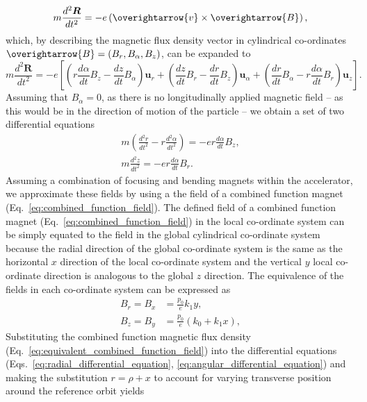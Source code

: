 \documentclass[../main.tex]{subfiles}
\begin{document}
\begin{equation}
m\frac{d^{2}\boldsymbol{R}}{dt^{2}}=-e\left(\overightarrow{v}\times\overightarrow{B}\right),
\label{eq:Lorentz_particle_equating_forces}
\end{equation}
which, by describing the magnetic flux density vector in cylindrical co-ordinates $\overightarrow{B} = \left(B_{r},B_{\alpha},B_{z}\right)$, can be expanded to
\begin{equation}
m\frac{d^{2}\boldsymbol{R}}{dt^{2}} = -e\left[\left(r\frac{d\alpha}{dt}B_{z}-\frac{dz}{dt}B_{\alpha}\right)\boldsymbol{u}_{r}+\left(\frac{dz}{dt}B_{r}-\frac{dr}{dt}B_{z}\right)\boldsymbol{u}_{\alpha}+\left(\frac{dr}{dt}B_{\alpha}-r\frac{d\alpha}{dt}B_{r}\right)\boldsymbol{u}_{z}\right].
\label{eq:Lorentz_particle_equating_forces_expanded}    
\end{equation}
Assuming that $B_{\alpha}=0$, as there is no longitudinally applied magnetic field -- as this would be in the direction of motion of the particle -- we obtain a set of two differential equations
\begin{align}
m\left(\frac{d^{2}r}{dt^{2}}-r\frac{d^{2}\alpha}{dt^{2}}\right)=-er\frac{d\alpha}{dt}B_{z},
\label{eq:radial_differential_equation} \\
m\frac{d^{2}z}{dt^{2}}=-er\frac{d\alpha}{dt}B_{r}.
\label{eq:angular_differential_equation}
\end{align}
Assuming a combination of focusing and bending magnets within the accelerator, we approximate these fields by using a the field of a combined function magnet (Eq.~\ref{eq:combined_function_field}). The defined field of a combined function magnet (Eq.~\ref{eq:combined_function_field}) in the local co-ordinate system can be simply equated to the field in the global cylindrical co-ordinate system  because the radial direction of the global co-ordinate system is the same as the horizontal $x$ direction of the local co-ordinate system and the vertical $y$ local co-ordinate direction is analogous to the global $z$ direction. The equivalence of the fields in each co-ordinate system can be expressed as
\begin{align}
B_{r} = B_{x} &= \frac{p_{0}}{e}k_{1}y, \\
B_{z} = B_{y} &= \frac{p_{0}}{e}\left(k_{0}+k_{1}x\right),
\label{eq:equivalent_combined_function_field}
\end{align}
Substituting the combined function magnetic flux density (Eq.~\ref{eq:equivalent_combined_function_field}) into the differential equations (Eqs.~\ref{eq:radial_differential_equation}, \ref{eq:angular_differential_equation}) and making the substitution $r=\rho+x$ to account for varying transverse position around the reference orbit yields
\end{document}
